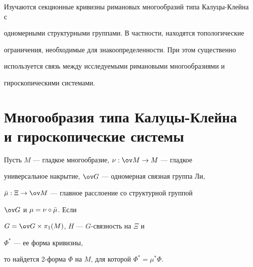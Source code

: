  


\pagestyle{plain} %


 


 




 


\maketitle 


 




 


 


Изучаются секционные кривизны римановых многообразий типа Калуцы-Клейна с 


одномерными структурными группами. В частности, находятся топологические 


ограничения, необходимые для знакоопределенности. При этом существенно 


используется связь между исследуемыми римановыми многообразиями и 


гироскопическими системами. 


 


\section{Многообразия типа Калуцы-Клейна\protect\\ 


и гироскопические системы} 


 


Пусть $M$ --- гладкое многообразие, $\nu:\ov M\to M$ --- гладкое 


универсальное накрытие, $\ov G$ --- одномерная связная группа Ли, 


$\Bar \mu:\Xi\to\ov M$ --- главное расслоение со структурной группой 


$\ov G$ и $\mu=\nu\circ\Bar\mu$. Если 


$G=\ov G\times\pi_1(M)$, $H$ --- $G$-связность на $\Xi$ и 


$\Phi^*$ --- ее форма кривизны, 


то найдется 2-форма $\Phi$ на $M$, для которой $\Phi^*=\mu^*\Phi$. 


